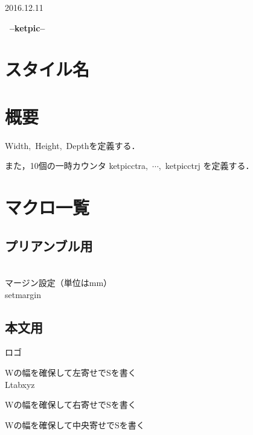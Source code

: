 \documentclass[a4j]{jarticle}
\begin{document}
\begin{flushright}
2016.12.11
\end{flushright}


\begin{center}
{\bf \huge \ketpic\ --ketpic--}\vspace{3mm}\\
\end{center}

\section{スタイル名}

\section{概要}

\bs Width,\ \bs Height,\ \bs Depthを定義する．

また，10個の一時カウンタ ketpicctra,\ $\cdots$,\ ketpicctrj を定義する．

\section{マクロ一覧}

\subsection{プリアンブル用}


\\
\tab{}マージン設定（単位はmm）\\
\rei \bs setmargin

\subsection{本文用}

ロゴ \ketpic

Wの幅を確保して左寄せでSを書く\\
\rei \bs Ltab\br{5cm}xyz

Wの幅を確保して右寄せでSを書く

Wの幅を確保して中央寄せでSを書く
\end{document}
